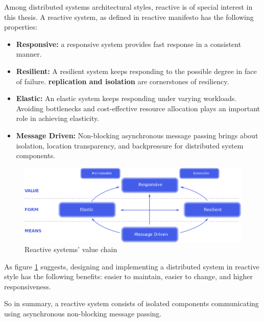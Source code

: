 \documentclass[a4]{report}
\begin{document}
    Among distributed systems architectural styles, reactive is of special interest in this thesis.
    A reactive system, as defined in reactive manifesto \cite{reactive-manifesto} has the following properties:
    \begin{itemize}
        \item \textbf{Responsive:} a responsive system provides fast response in a consistent manner.
        \item \textbf{Resilient:} A resilient system keeps responding to the possible degree in face of failure.
        \textbf{replication and isolation} are cornerstones of resiliency.
        \item \textbf{Elastic:} An elastic system keeps responding under varying workloads. Avoiding bottlenecks and cost-effective resource allocation plays an important role in achieving elasticity.
        \item \textbf{Message Driven:} Non-blocking asynchronous message passing brings about isolation, location transparency, and backpressure for distributed system components.
    \end{itemize}

    \begin{figure}[ht]
        \caption{Reactive systems' value chain \cite{reactive-manifesto}}
        \label{fig:reactive-value}
        \includegraphics[width=\linewidth, scale=0.4]{images/reactive-traits.png}
    \end{figure}

    As figure \ref{fig:reactive-value} suggests, designing and implementing a distributed system in reactive style
    has the following benefits: easier to maintain, easier to change, and higher responsiveness.

    So in summary, a reactive system consists of isolated components communicating using asynchronous non-blocking message passing.
\end{document}
